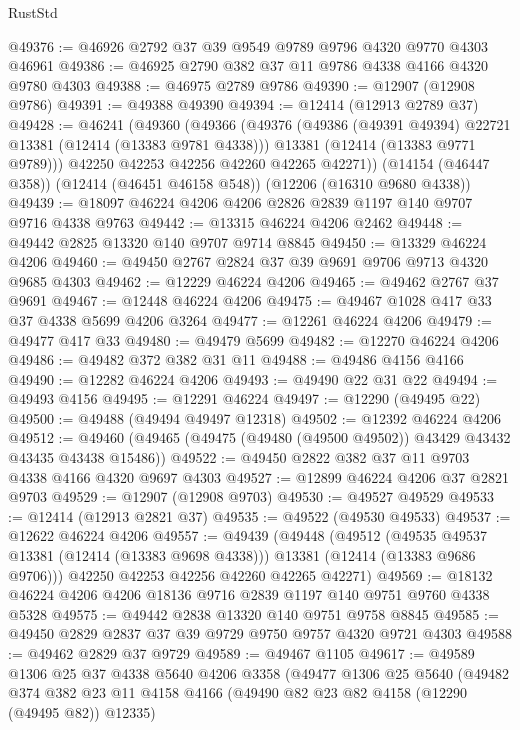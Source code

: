 \begin{lexlean}{RustStd}
\begin{coremodule}
@49376 := @46926 @2792 @37 @39 @9549 @9789 @9796 @4320 @9770 @4303 @46961
@49386 := @46925 @2790 @382 @37 @11 @9786 @4338 @4166 @4320 @9780 @4303
@49388 := @46975 @2789 @9786
@49390 := @12907 (@12908 @9786)
@49391 := @49388 @49390
@49394 := @12414 (@12913 @2789 @37)
@49428 := @46241
    (@49360
      (@49366
        (@49376
          (@49386 (@49391 @49394) @22721 @13381 (@12414 (@13383 @9781 @4338)))
          @13381
          (@12414 (@13383 @9771 @9789)))
        @42250
        @42253
        @42256
        @42260
        @42265
        @42271))
    (@14154 (@46447 @358))
    (@12414 (@46451 @46158 @548))
    (@12206 (@16310 @9680 @4338))
@49439 := @18097 @46224 @4206 @4206 @2826 @2839 @1197 @140 @9707 @9716 @4338 @9763
@49442 := @13315 @46224 @4206 @2462
@49448 := @49442 @2825 @13320 @140 @9707 @9714 @8845
@49450 := @13329 @46224 @4206
@49460 := @49450 @2767 @2824 @37 @39 @9691 @9706 @9713 @4320 @9685 @4303
@49462 := @12229 @46224 @4206
@49465 := @49462 @2767 @37 @9691
@49467 := @12448 @46224 @4206
@49475 := @49467 @1028 @417 @33 @37 @4338 @5699 @4206 @3264
@49477 := @12261 @46224 @4206
@49479 := @49477 @417 @33
@49480 := @49479 @5699
@49482 := @12270 @46224 @4206
@49486 := @49482 @372 @382 @31 @11
@49488 := @49486 @4156 @4166
@49490 := @12282 @46224 @4206
@49493 := @49490 @22 @31 @22
@49494 := @49493 @4156
@49495 := @12291 @46224
@49497 := @12290 (@49495 @22)
@49500 := @49488 (@49494 @49497 @12318)
@49502 := @12392 @46224 @4206
@49512 := @49460 (@49465 (@49475 (@49480 (@49500 @49502)) @43429 @43432 @43435 @43438 @15486))
@49522 := @49450 @2822 @382 @37 @11 @9703 @4338 @4166 @4320 @9697 @4303
@49527 := @12899 @46224 @4206 @37 @2821 @9703
@49529 := @12907 (@12908 @9703)
@49530 := @49527 @49529
@49533 := @12414 (@12913 @2821 @37)
@49535 := @49522 (@49530 @49533)
@49537 := @12622 @46224 @4206
@49557 := @49439
    (@49448
      (@49512
        (@49535 @49537 @13381 (@12414 (@13383 @9698 @4338)))
        @13381
        (@12414 (@13383 @9686 @9706)))
      @42250
      @42253
      @42256
      @42260
      @42265
      @42271)
@49569 := @18132 @46224 @4206 @4206 @18136 @9716 @2839 @1197 @140 @9751 @9760 @4338 @5328
@49575 := @49442 @2838 @13320 @140 @9751 @9758 @8845
@49585 := @49450 @2829 @2837 @37 @39 @9729 @9750 @9757 @4320 @9721 @4303
@49588 := @49462 @2829 @37 @9729
@49589 := @49467 @1105
@49617 := @49589
    @1306
    @25
    @37
    @4338
    @5640
    @4206
    @3358
    (@49477
      @1306
      @25
      @5640
      (@49482
        @374
        @382
        @23
        @11
        @4158
        @4166
        (@49490 @82 @23 @82 @4158 (@12290 (@49495 @82)) @12335)

\end{coremodule}
\end{lexlean}
